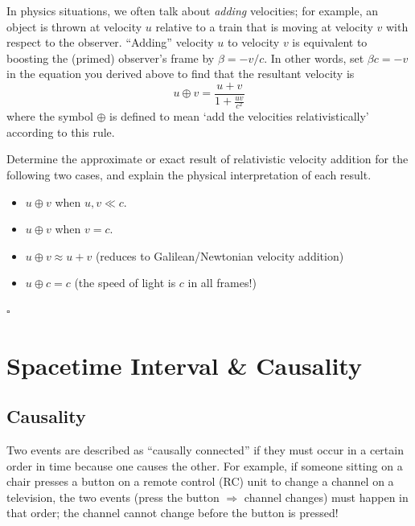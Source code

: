 \documentclass[11pt, letterpaper, openany]{book}
\newenvironment{exercise}[1][Exercise]{%
  \tcolorbox[blanker, breakable, left=1em,
    before skip=1em, after skip=1em,
    borderline west={3pt}{0pt}{PhysNavy},
    colback=PhysCream,
    before upper={\textcolor{PhysNavy}{\sffamily\bfseries #1:}\space}
  ]%
}{%
  \endtcolorbox%
}
\newenvironment{solution}[1][Solution]{%
  \tcolorbox[blanker, breakable, left=1em,
    before skip=1em, after skip=1em,
    borderline west={2pt}{0pt}{PhysTeal},
    colback=PhysCream,
    before upper={\textcolor{PhysTeal}{\sffamily\bfseries #1.}\space}
  ]%
}{%
  \hfill\textcolor{PhysTeal}{\ensuremath{\square}}\endtcolorbox%
}
\begin{document}
In physics situations, we often talk about \textit{adding} velocities; for example, an object is thrown at velocity $u$ relative to a train that is moving at velocity $v$ with respect to the observer. ``Adding'' velocity $u$ to velocity $v$ is equivalent to boosting the (primed) observer's frame by $\beta = -v/c$. In other words, set $\beta c = -v$ in the equation you derived above to find that the resultant velocity is
\[ u \oplus v = \frac{u + v}{1 + \frac{uv}{c^2}} \]
where the symbol $\oplus$ is defined to mean `add the velocities relativistically' according to this rule.

\begin{exercise}[Exercise 12]
Determine the approximate or exact result of relativistic velocity addition for the following two cases, and explain the physical interpretation of each result.
\begin{itemize}
    \item $u \oplus v$ when $u, v \ll c$.
    \item $u \oplus v$ when $v = c$.
\end{itemize}
\end{exercise}
\begin{solution}
\begin{itemize}
    \item $u \oplus v \approx u + v$ (reduces to Galilean/Newtonian velocity addition)
    \item $u \oplus c = c$ (the speed of light is $c$ in all frames!)
\end{itemize}
\end{solution}

\chapter{Spacetime Interval \& Causality}

\section{Causality}

Two events are described as ``causally connected'' if they must occur in a certain order in time because one causes the other. For example, if someone sitting on a chair presses a button on a remote control (RC) unit to change a channel on a television, the two events (press the button $\Rightarrow$ channel changes) must happen in that order; the channel cannot change before the button is pressed!
\end{document}
